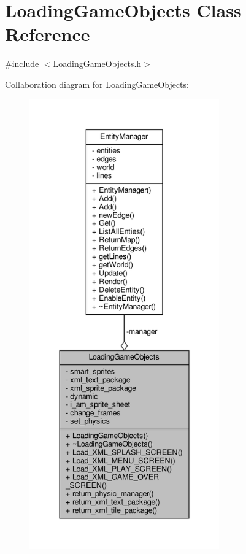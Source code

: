 \hypertarget{classLoadingGameObjects}{}\section{Loading\+Game\+Objects Class Reference}
\label{classLoadingGameObjects}


{\ttfamily \#include $<$Loading\+Game\+Objects.\+h$>$}



Collaboration diagram for Loading\+Game\+Objects\+:
\nopagebreak
\begin{figure}[H]
\begin{center}
\leavevmode
\includegraphics[height=550pt]{classLoadingGameObjects__coll__graph}
\end{center}
\end{figure}
